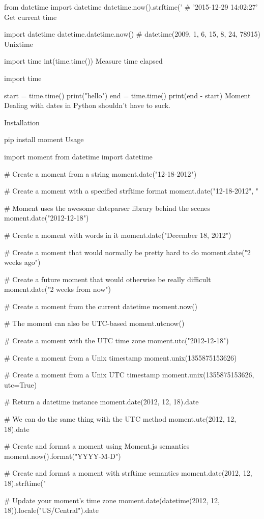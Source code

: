 from datetime import datetime
datetime.now().strftime('%
# '2015-12-29 14:02:27'
Get current time

import datetime
datetime.datetime.now()
# datetime(2009, 1, 6, 15, 8, 24, 78915)
Unixtime

import time
int(time.time())
Measure time elapsed

import time

start = time.time()
print("hello")
end = time.time()
print(end - start)
Moment
Dealing with dates in Python shouldn't have to suck.

Installation

pip install moment
Usage

import moment
from datetime import datetime

# Create a moment from a string
moment.date("12-18-2012")

# Create a moment with a specified strftime format
moment.date("12-18-2012", "%

# Moment uses the awesome dateparser library behind the scenes
moment.date("2012-12-18")

# Create a moment with words in it
moment.date("December 18, 2012")

# Create a moment that would normally be pretty hard to do
moment.date("2 weeks ago")

# Create a future moment that would otherwise be really difficult
moment.date("2 weeks from now")

# Create a moment from the current datetime
moment.now()

# The moment can also be UTC-based
moment.utcnow()

# Create a moment with the UTC time zone
moment.utc("2012-12-18")

# Create a moment from a Unix timestamp
moment.unix(1355875153626)

# Create a moment from a Unix UTC timestamp
moment.unix(1355875153626, utc=True)

# Return a datetime instance
moment.date(2012, 12, 18).date

# We can do the same thing with the UTC method
moment.utc(2012, 12, 18).date

# Create and format a moment using Moment.js semantics
moment.now().format("YYYY-M-D")

# Create and format a moment with strftime semantics
moment.date(2012, 12, 18).strftime("%

# Update your moment's time zone
moment.date(datetime(2012, 12, 18)).locale("US/Central").date

